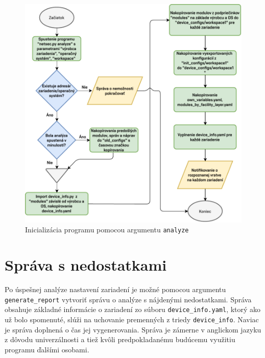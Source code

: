 \begin{figure}[H]
	\begin{center}
		\includegraphics[scale=0.8]{obrazky/netsec_analyze.pdf}
	\end{center}
	\caption[Inicializácia programu pomocou argumentu \texttt{analyze}]{Inicializácia programu pomocou argumentu \texttt{analyze}}
	\label{fac_layer}
\end{figure}

\section{Správa s nedostatkami}
Po úspešnej analýze nastavení zariadení je možné pomocou argumentu \texttt{generate\_report} vytvoriť správu o analýze s nájdenými nedostatkami. Správa obsahuje základné informácie o zariadení zo súboru \texttt{device\_info.yaml}, ktorý ako už bolo spomenuté, slúži na uchovanie premenných z triedy \texttt{device\_info}. Naviac je správa doplnená o čas jej vygenerovania. Správa je zámerne v anglickom jazyku z dôvodu univerzálnosti a tiež kvôli predpokladanému budúcemu využitiu programu ďalšími osobami.

